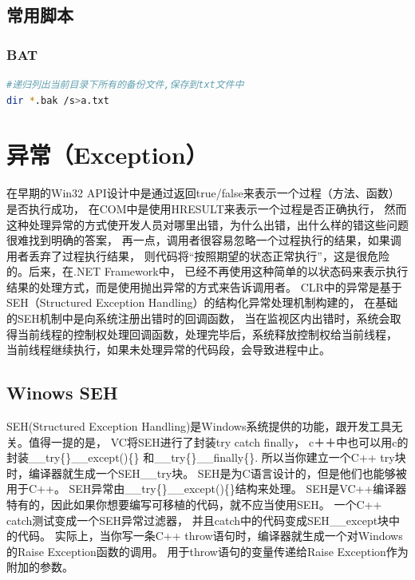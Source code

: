 \documentclass{book}
\begin{document}
\section{常用脚本}

\subsection{BAT}

\begin{lstlisting}[language=Bash]
#递归列出当前目录下所有的备份文件,保存到txt文件中
dir *.bak /s>a.txt
\end{lstlisting}

\chapter{异常（Exception）}

\clearpage
\mbox{}         
\clearpage

在早期的Win32 API设计中是通过返回true/false来表示一个过程（方法、函数）是否执行成功，
在COM中是使用HRESULT来表示一个过程是否正确执行，
然而这种处理异常的方式使开发人员对哪里出错，为什么出错，出什么样的错这些问题很难找到明确的答案，
再一点，调用者很容易忽略一个过程执行的结果，如果调用者丢弃了过程执行结果，
则代码将“按照期望的状态正常执行”，这是很危险的。后来，在.NET Framework中，
已经不再使用这种简单的以状态码来表示执行结果的处理方式，而是使用抛出异常的方式来告诉调用者。
CLR中的异常是基于SEH（Structured Exception Handling）的结构化异常处理机制构建的，
在基础的SEH机制中是向系统注册出错时的回调函数，
当在监视区内出错时，系统会取得当前线程的控制权处理回调函数，处理完毕后，系统释放控制权给当前线程，
当前线程继续执行，如果未处理异常的代码段，会导致进程中止。

\section{Winows SEH}

SEH(Structured Exception Handling)是Windows系统提供的功能，跟开发工具无关。值得一提的是，
VC将SEH进行了封装try catch finally，
c＋＋中也可以用c的封装\_\_try\{\}\_\_except()\{\} 和\_\_try\{\}\_\_finally\{\}.
所以当你建立一个C++ try块时，编译器就生成一个SEH\_\_try块。
SEH是为C语言设计的，但是他们也能够被用于C++。
SEH异常由\_\_try\{\}\_\_except()\{\}结构来处理。
SEH是VC++编译器特有的，因此如果你想要编写可移植的代码，就不应当使用SEH。
一个C++ catch测试变成一个SEH异常过滤器，
并且catch中的代码变成SEH\_\_except块中的代码。
实际上，当你写一条C++ throw语句时，编译器就生成一个对Windows的Raise Exception函数的调用。
用于throw语句的变量传递给Raise Exception作为附加的参数。
\end{document}
